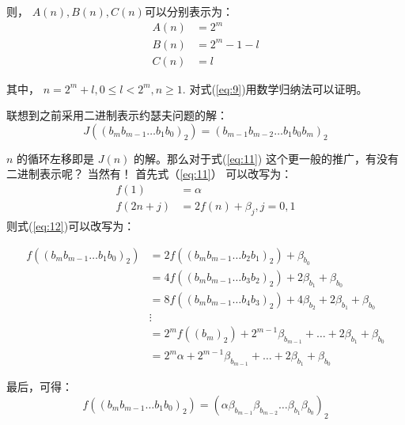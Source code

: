 \documentclass[10pt,a4paper,UTF8]{article}
\begin{document}
则， \(A(n),B(n),C(n)\)可以分别表示为：
\begin{equation}
\label{eq:10}
\begin{split}
A(n) &= 2^{m} \\
B(n) & = 2^{m} -1 -l \\
C(n) & = l
\end{split}
\end{equation}

其中， \(n = 2^{m}+l, 0\le l < 2^{m},n\ge 1\). 对式(\ref{eq:9})用数学归纳法可以证明。

联想到之前采用二进制表示约瑟夫问题的解：
\begin{equation}
\label{eq:11}
J((b_{m}b_{m-1}\ldots b_{1}b_{0})_{2}) = (b_{m-1}b_{m-2}\ldots b_{1}b_{0}b_{m})_{2}
\end{equation}

\(n\) 的循环左移即是 \(J(n)\) 的解。那么对于式(\ref{eq:11}) 这个更一般的推广，有没有二进制表示呢？ 当然有！ 首先式（\ref{eq:11}） 可以改写为：
\begin{equation}
\label{eq:12}
\begin{split}
f(1) &=  \alpha \\
f(2n +j) &= 2f(n) +\beta_{j},  j=0,1
\end{split}
\end{equation}
则式(\ref{eq:12})可以改写为：

\begin{equation}
\label{eq:13}
\begin{split}
f((b_{m}b_{m-1}\ldots b_{1}b_{0})_{2}) &=  2f((b_{m}b_{m-1}\ldots b_{2}b_{1})_{2}) + \beta_{b_{0}} \\
&= 4f((b_{m}b_{m-1}\ldots b_{3}b_{2})_{2})+ 2\beta_{b_{1}} + \beta_{b_{0}} \\
&= 8f((b_{m}b_{m-1}\ldots b_{4}b_{3})_{2})+ 4\beta_{b_{2}} + 2\beta_{b_{1}} + \beta_{b_{0}} \\
& \vdots \\
&= 2^{m}f((b_{m})_{2}) + 2^{m-1}\beta_{b_{m-1}} + \ldots + 2\beta_{b_{1}} + \beta_{b_{0}} \\
&= 2^{m} \alpha + 2^{m-1}\beta_{b_{m-1}} + \ldots + 2\beta_{b_{1}} + \beta_{b_{0}} 
\end{split}
\end{equation}

最后，可得：
\begin{equation}
\label{eq:14}
f((b_{m}b_{m-1}\ldots b_{1}b_{0})_{2}) = (\alpha\beta_{b_{m-1}}\beta_{b_{m-2}}\ldots \beta_{b_{1}}\beta_{b_{0}})_{2}
\end{equation}
\end{document}
